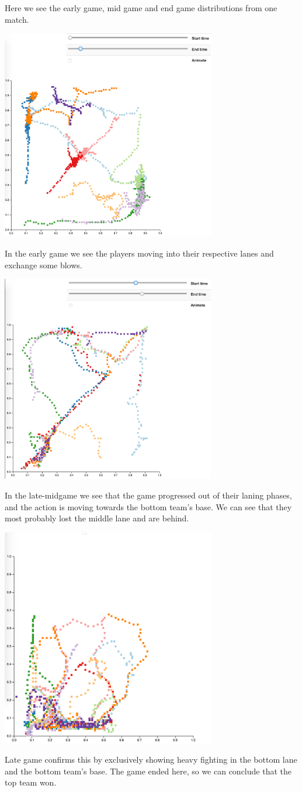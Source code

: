 Here we see the early game, mid game and end game distributions from one match.

\includegraphics[width=0.7\textwidth]{earlygame}

In the early game we see the players moving into their respective lanes and exchange some blows.

\includegraphics[width=0.7\textwidth]{midgame}

In the late-midgame we see that the game progressed out of their laning phases, and the action is moving towards the bottom team's base. We can see that they most probably lost the middle lane and are behind.

\includegraphics[width=0.7\textwidth]{lategame}

Late game confirms this by exclusively showing heavy fighting in the bottom lane and the bottom team's base. The game ended here, so we can conclude that the top team won.

